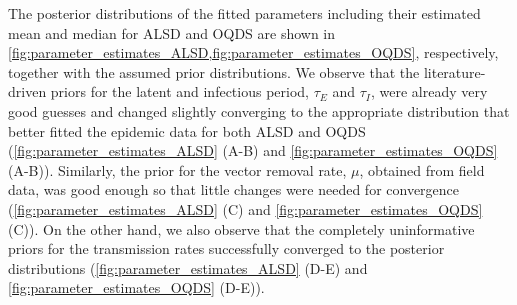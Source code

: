 The posterior distributions of the fitted parameters including their
estimated mean and median for ALSD and OQDS are shown in
\cref{fig:parameter_estimates_ALSD,fig:parameter_estimates_OQDS}, respectively,
together with the assumed prior distributions. We observe that the
literature-driven priors for the latent and infectious period, $\tau_E$ and
$\tau_I$, were already very good guesses and changed slightly converging to the
appropriate distribution that better fitted the epidemic data for both ALSD and
OQDS (\cref{fig:parameter_estimates_ALSD} (A-B) and
\cref{fig:parameter_estimates_OQDS} (A-B)). Similarly, the prior for the vector
removal rate, $\mu$, obtained from field data, was good enough so that little
changes were needed for convergence (\cref{fig:parameter_estimates_ALSD} (C)
and
\cref{fig:parameter_estimates_OQDS} (C)). On the other hand, we also observe
that the completely uninformative priors for the transmission rates
successfully converged to the posterior distributions
(\cref{fig:parameter_estimates_ALSD} (D-E) and
\cref{fig:parameter_estimates_OQDS} (D-E)).

